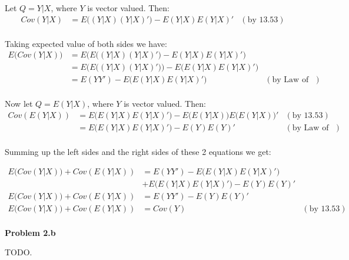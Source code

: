 \documentclass[12pt]{article}
\begin{document}
Let $Q=Y|X$, where $Y$ is vector valued. 
Then:
\begin{equation*}
	\begin{aligned}
	Cov(Y|X) &= E\big((Y|X)(Y|X)'\big) - E(Y|X)E(Y|X)' &(\textrm{by 13.53})\\
	\end{aligned}
\end{equation*}

Taking expected value of both sides we have:
\begin{equation*}
	\begin{aligned}
	E\big(Cov(Y|X)\big) &= E\Big(E\big((Y|X)(Y|X)'\big) - E(Y|X)E(Y|X)'\Big)\\
	              &= E\Big(E\big((Y|X)(Y|X)'\big)\Big) - E\Big(E(Y|X)E(Y|X)'\Big)\\
	              &= E(YY') - E\Big(E(Y|X)E(Y|X)'\Big) &(\textrm{by Law of Tot. Expect.})\\
	\end{aligned}
\end{equation*}

Now let $Q=E(Y|X)$, where $Y$ is vector valued. 
Then:
\begin{equation*}
	\begin{aligned}
	Cov(E(Y|X)) &= E\big(E(Y|X)E(Y|X)'\big) - E\big(E(Y|X)\big)E\big(E(Y|X)\big)' &(\textrm{by 13.53})\\
	              &= E\big(E(Y|X)E(Y|X)'\big) - E(Y)E(Y)' &(\textrm{by Law of Tot. Expect.})\\
	\end{aligned}
\end{equation*}

Summing up the left sides and the right sides of these 2 equations we get:

\begin{equation*}
	\begin{aligned}
	E\big(Cov(Y|X)\big) + Cov(E(Y|X)) &= E(YY') - E\Big(E(Y|X)E(Y|X)'\Big) \\&+ E\big(E(Y|X)E(Y|X)'\big) - E(Y)E(Y)'\\
	E\big(Cov(Y|X)\big) + Cov(E(Y|X)) &= E(YY') - E(Y)E(Y)' \\
	E\big(Cov(Y|X)\big) + Cov(E(Y|X)) &= Cov(Y) &(\textrm{by 13.53})\\
	\end{aligned}
\end{equation*}


\textbf{Problem 2.b} 

TODO. 
\end{document}
